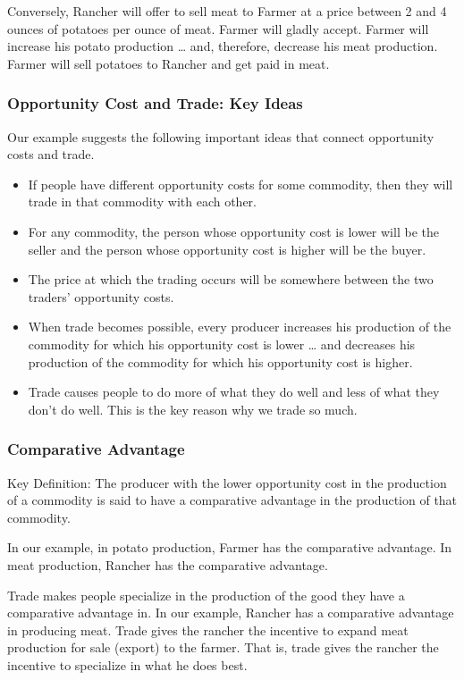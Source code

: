 \documentclass[
  letterpaper,
]{book}
\begin{document}
Conversely, Rancher will offer to sell meat to Farmer at a price between
2 and 4 ounces of potatoes per ounce of meat. Farmer will gladly accept.
Farmer will increase his potato production \ldots{} and, therefore,
decrease his meat production. Farmer will sell potatoes to Rancher and
get paid in meat.

\subsubsection{Opportunity Cost and Trade: Key
Ideas}\label{opportunity-cost-and-trade-key-ideas}

Our example suggests the following important ideas that connect
opportunity costs and trade.

\begin{itemize}
\item
  If people have different opportunity costs for some commodity, then
  they will trade in that commodity with each other.
\item
  For any commodity, the person whose opportunity cost is lower will be
  the seller and the person whose opportunity cost is higher will be the
  buyer.
\item
  The price at which the trading occurs will be somewhere between the
  two traders' opportunity costs.
\item
  When trade becomes possible, every producer increases his production
  of the commodity for which his opportunity cost is lower \ldots{} and
  decreases his production of the commodity for which his opportunity
  cost is higher.
\item
  Trade causes people to do more of what they do well and less of what
  they don't do well. This is the key reason why we trade so much.
\end{itemize}

\subsubsection{Comparative Advantage}\label{comparative-advantage}

Key Definition: The producer with the lower opportunity cost in the
production of a commodity is said to have a comparative advantage in the
production of that commodity.

In our example, in potato production, Farmer has the comparative
advantage. In meat production, Rancher has the comparative advantage.

Trade makes people specialize in the production of the good they have a
comparative advantage in. In our example, Rancher has a comparative
advantage in producing meat. Trade gives the rancher the incentive to
expand meat production for sale (export) to the farmer. That is, trade
gives the rancher the incentive to specialize in what he does best.
\end{document}
